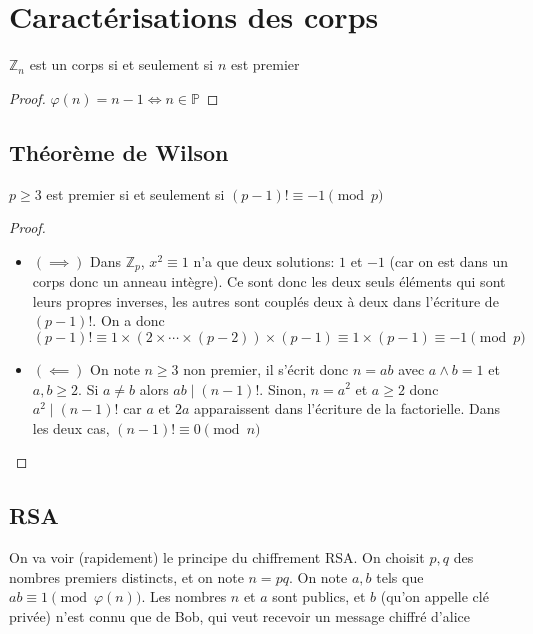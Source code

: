 \section{Caractérisations des corps}

\begin{prop}
    $\mathbb Z_n$ est un corps si et seulement si $n$ est premier
\end{prop}

\begin{proof}
    $\varphi(n)=n-1\iff n\in \mathbb P$
\end{proof}

\subsection{Théorème de Wilson}

\begin{res}
    $p\geq 3$ est premier si et seulement si $(p-1)!\equiv -1\pmod p$
\end{res}

\begin{proof}~
    \begin{itemize}
        \item $(\implies)$ Dans $\mathbb Z_p$, $x^2\equiv 1$ n'a que deux solutions: $1$ et $-1$ (car on est dans un corps donc un anneau intègre). Ce sont donc les deux seuls éléments qui sont leurs propres inverses, les autres sont couplés deux à deux dans l'écriture de $(p-1)!$. On a donc \[
                (p-1)!\equiv 1\times (2\times \cdots \times (p-2))\times (p-1)\equiv 1\times (p-1)\equiv -1 \pmod p
            \]
        \item $(\impliedby)$ On note $n\geq 3$ non premier, il s'écrit donc $n=ab$ avec $a\land b=1$ et $a, b\geq 2$. Si $a\neq b$ alors $ab\;|\;(n-1)!$. Sinon, $n=a^2$ et $a\geq 2$ donc $a^2\;|\;(n-1)!$ car $a$ et $2a$ apparaissent dans l'écriture de la factorielle. Dans les deux cas, $(n-1)!\equiv 0\pmod n$
    \end{itemize}
\end{proof}

\subsection{RSA}

On va voir (rapidement) le principe du chiffrement RSA. On choisit $p, q$ des nombres premiers distincts, et on note $n=pq$. On note $a, b$ tels que $ab\equiv 1\pmod{\varphi(n)}$. Les nombres $n$ et $a$ sont publics, et $b$ (qu'on appelle clé privée) n'est connu que de Bob, qui veut recevoir un message chiffré d'alice

